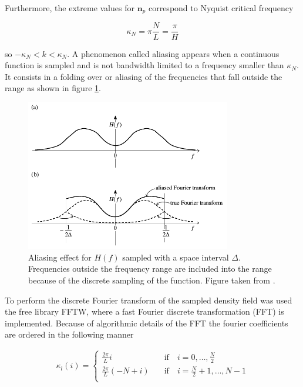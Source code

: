 Furthermore, the extreme values for $\boldsymbol{n}_p$ correspond to Nyquist critical 
frequency 

\[\kappa_N = \pi\frac{N}{L} = \frac{\pi}{H} \]

so $-\kappa_N < k < \kappa_N $. A phenomenon called aliasing appears when a continuous 
function is sampled and is not bandwidth limited to a frequency smaller than $\kappa_N$. 
It consists in a folding over or aliasing of the frequencies that fall outside the range
as shown in figure \ref{alias}. 

\begin{figure}[htbp]
       \centering
               \includegraphics[width=0.8\textwidth]{Images/chapter3/aliasing.png}
       \caption{\small Aliasing effect for $H(f)$ sampled with a space interval $\Delta$.
       Frequencies outside the frequency range are included into the range because
       of the discrete sampling of the function. Figure taken from \cite{Press}.}
       \label{alias}
 \end{figure}

To perform the discrete Fourier transform of the sampled density field was used the free 
library FFTW, where a fast Fourier discrete transformation (FFT) is implemented.
Because of algorithmic details of the FFT the fourier coefficients are ordered in the
following manner

\begin{eqnarray*}
\kappa_l(i) =\left\{ \begin{array}{cl}
\frac{2\pi}{L}i \hspace{1em} & \mathrm{if} \hspace{1em} i = 0,\dots ,\frac{N}{2}\\
\frac{2\pi}{L}(-N+i) \hspace{1em} & \mathrm{if} \hspace{1em} i = \frac{N}{2}+1,\dots ,N-1\\
\end{array}\right.
\end{eqnarray*} 


